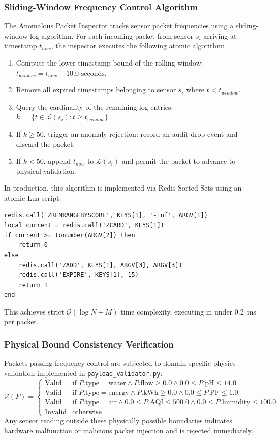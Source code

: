 \subsubsection{Sliding-Window Frequency Control Algorithm}
The Anomalous Packet Inspector tracks sensor packet frequencies using a sliding-window log algorithm. For each incoming packet from sensor $s_i$ arriving at timestamp $t_{now}$, the inspector executes the following atomic algorithm:
\begin{enumerate}
    \item Compute the lower timestamp bound of the rolling window: $t_{window} = t_{now} - 10.0\text{ seconds}$.
    \item Remove all expired timestamps belonging to sensor $s_i$ where $t < t_{window}$.
    \item Query the cardinality of the remaining log entries: $k = |\{t \in \mathcal{L}(s_i) : t \ge t_{window}\}|$.
    \item If $k \ge 50$, trigger an anomaly rejection: record an audit drop event and discard the packet.
    \item If $k < 50$, append $t_{now}$ to $\mathcal{L}(s_i)$ and permit the packet to advance to physical validation.
\end{enumerate}

In production, this algorithm is implemented via Redis Sorted Sets using an atomic Lua script:
\begin{verbatim}
redis.call('ZREMRANGEBYSCORE', KEYS[1], '-inf', ARGV[1])
local current = redis.call('ZCARD', KEYS[1])
if current >= tonumber(ARGV[2]) then
    return 0
else
    redis.call('ZADD', KEYS[1], ARGV[3], ARGV[3])
    redis.call('EXPIRE', KEYS[1], 15)
    return 1
end
\end{verbatim}
This achieves strict $\mathcal{O}(\log N + M)$ time complexity, executing in under 0.2~ms per packet.

\subsubsection{Physical Bound Consistency Verification}
Packets passing frequency control are subjected to domain-specific physics validation implemented in \texttt{payload\_validator.py}:
\begin{equation}
\mathcal{V}(P) = \begin{cases}
\text{Valid} & \text{if } P.\text{type} = \text{water} \land P.\text{flow} \ge 0.0 \land 0.0 \le P.\text{pH} \le 14.0 \\
\text{Valid} & \text{if } P.\text{type} = \text{energy} \land P.\text{kWh} \ge 0.0 \land 0.0 \le P.\text{PF} \le 1.0 \\
\text{Valid} & \text{if } P.\text{type} = \text{air} \land 0.0 \le P.\text{AQI} \le 500.0 \land 0.0 \le P.\text{humidity} \le 100.0 \\
\text{Invalid} & \text{otherwise}
\end{cases}
\end{equation}
Any sensor reading outside these physically possible boundaries indicates hardware malfunction or malicious packet injection and is rejected immediately.

